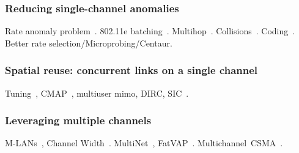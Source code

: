 \subsubsection{Reducing single-channel anomalies}
Rate anomaly problem~\cite{heusse_anomaly}. 802.11e batching~\cite{80211,80211n}. Multihop~\cite{rodrig_thesis,bahl_repeater}. Collisions~\cite{tan_fica}. Coding~\cite{katti_xors}. Better rate selection/Microprobing/Centaur.

\subsubsection{Spatial reuse: concurrent links on a single channel}
Tuning~\cite{kim_tuning}, CMAP~\cite{vutukuru_cmap}, multiuser mimo, DIRC, SIC~\cite{halperin_sic}.

\subsubsection{Leveraging multiple channels}
M-LANs~\cite{marsan_multichan}, Channel Width~\cite{chandra_chanwidth}. MultiNet~\cite{chandra_multinet}, FatVAP~\cite{kandula_fatvap}. Multichannel~CSMA~\cite{nasipuri_multichan}. 